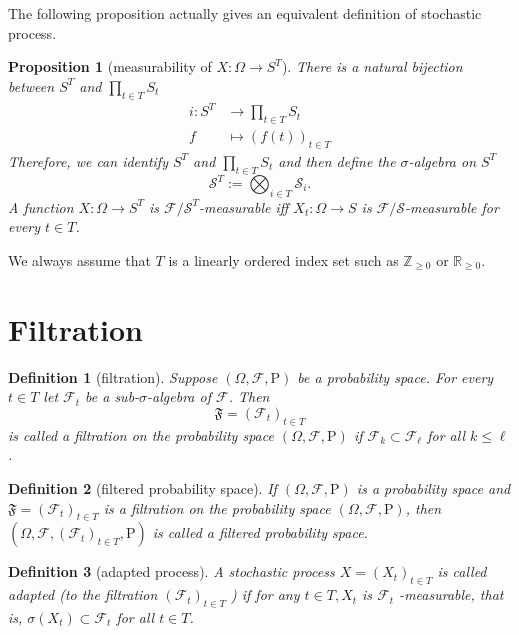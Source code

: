 \documentclass{report}
\newtheorem{definition}{Definition}[section]
\newtheorem{proposition}{Proposition}[section]
\theoremstyle{nonumberplain}
\begin{document}
The following proposition actually gives an equivalent definition of stochastic process.
\begin{proposition}[measurability of $X:\Omega\to S^T$]
	There is a natural bijection between $S^T$ and $\prod_{t\in T}S_t$
	\begin{align*}
	i:S^T&\longrightarrow \prod_{t\in T}S_t\\
	f&\longmapsto (f(t))_{t\in T}
	\end{align*} 
	Therefore, we can identify $S^T$ and $\prod_{t\in T}S_t$ and then define the $\sigma$-algebra on $S^T$
	\[
	\mathcal{S}^T:=\bigotimes_{i\in T}\mathcal{S}_i.
	\]
	A function $X: \Omega \rightarrow S^T$ is $\mathcal{F}/\mathcal{S}^{T}$-measurable iff $X_{t}: \Omega \rightarrow S$ is $\mathcal{F}/\mathcal{S}$-measurable for every $t \in T$.
\end{proposition}

We always assume that $T$ is a linearly ordered index set such as $\mathbb{Z}_{\ge 0}$ or $\mathbb{R}_{\ge 0}$.
\section{Filtration}
\begin{definition}[filtration]
	Suppose $(\Omega,\mathcal{F},\mathrm{P})$ be a probability space. For every $t\in T$ let $\mathcal{F}_{t}$ be a sub-$\sigma$-algebra of $\mathcal{F}$. Then
	\[
	\mathfrak{F} =(\mathcal{F}_{t})_{t\in T}
	\]
	is called a \emph{filtration} on the probability space $(\Omega,\mathcal{F},\mathrm{P})$ if $\mathcal {F}_{k}\subset \mathcal{F}_{\ell}$ for all $k\leq \ell$. 
\end{definition}
\begin{definition}[filtered probability space]
	If $(\Omega,\mathcal{F},\mathrm{P})$ is a probability space and $ \mathfrak{F}=(\mathcal{F}_{t})_{t\in T }$ is a filtration on the probability space $(\Omega,\mathcal{F},\mathrm{P})$, then $(\Omega,\mathcal{F},(\mathcal{F}_{t})_{t\in T },\mathrm{P})$ is called a \emph{filtered probability space}.
\end{definition}

\begin{definition}[adapted process]
	A stochastic process $X=(X_{t})_{t \in T}$ is called \emph{adapted} (to the filtration $(\mathcal{F}_{t})_{t\in T}$ ) if for any $t \in T, X_{t}$ is $\mathcal{F}_{t}$ -measurable, that is, $\sigma(X_t)\subset \mathcal{F}_t$ for all $t\in T$.
\end{definition}
\end{document}
